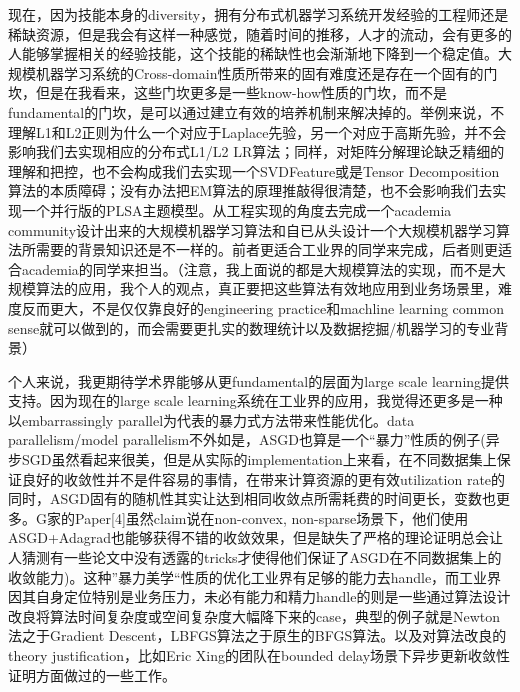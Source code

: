 现在，因为技能本身的diversity，拥有分布式机器学习系统开发经验的工程师还是稀缺资源，但是我会有这样一种感觉，随着时间的推移，人才的流动，会有更多的人能够掌握相关的经验技能，这个技能的稀缺性也会渐渐地下降到一个稳定值。大规模机器学习系统的Cross-domain性质所带来的固有难度还是存在一个固有的门坎，但是在我看来，这些门坎更多是一些know-how性质的门坎，而不是fundamental的门坎，是可以通过建立有效的培养机制来解决掉的。举例来说，不理解L1和L2正则为什么一个对应于Laplace先验，另一个对应于高斯先验，并不会影响我们去实现相应的分布式L1/L2 LR算法；同样，对矩阵分解理论缺乏精细的理解和把控，也不会构成我们去实现一个SVDFeature或是Tensor Decomposition算法的本质障碍；没有办法把EM算法的原理推敲得很清楚，也不会影响我们去实现一个并行版的PLSA主题模型。从工程实现的角度去完成一个academia community设计出来的大规模机器学习算法和自已从头设计一个大规模机器学习算法所需要的背景知识还是不一样的。前者更适合工业界的同学来完成，后者则更适合academia的同学来担当。（注意，我上面说的都是大规模算法的实现，而不是大规模算法的应用，我个人的观点，真正要把这些算法有效地应用到业务场景里，难度反而更大，不是仅仅靠良好的engineering practice和machline learning common sense就可以做到的，而会需要更扎实的数理统计以及数据挖掘/机器学习的专业背景）

个人来说，我更期待学术界能够从更fundamental的层面为large scale learning提供支持。因为现在的large scale learning系统在工业界的应用，我觉得还更多是一种以embarrassingly parallel为代表的暴力式方法带来性能优化。data parallelism/model parallelism不外如是，ASGD也算是一个“暴力”性质的例子(异步SGD虽然看起来很美，但是从实际的implementation上来看，在不同数据集上保证良好的收敛性并不是件容易的事情，在带来计算资源的更有效utilization rate的同时，ASGD固有的随机性其实让达到相同收敛点所需耗费的时间更长，变数也更多。G家的Paper[4]虽然claim说在non-convex, non-sparse场景下，他们使用ASGD+Adagrad也能够获得不错的收敛效果，但是缺失了严格的理论证明总会让人猜测有一些论文中没有透露的tricks才使得他们保证了ASGD在不同数据集上的收敛能力)。这种”暴力美学“性质的优化工业界有足够的能力去handle，而工业界因其自身定位特别是业务压力，未必有能力和精力handle的则是一些通过算法设计改良将算法时间复杂度或空间复杂度大幅降下来的case，典型的例子就是Newton法之于Gradient Descent，LBFGS算法之于原生的BFGS算法。以及对算法改良的theory justification，比如Eric Xing的团队在bounded delay场景下异步更新收敛性证明方面做过的一些工作。

